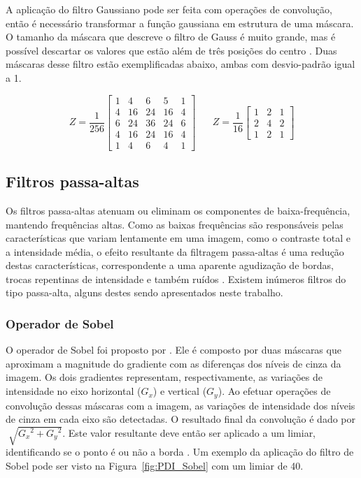 \documentclass[12pt,oneside,a4paper,english,french,spanish,brazil,]{abntex2}
\begin{document}
A aplicação do filtro Gaussiano pode ser feita com operações de convolução, então é necessário transformar a função gaussiana em estrutura de uma máscara. O tamanho da máscara que descreve o filtro de Gauss é muito grande, mas é possível descartar os valores que estão além de três posições do centro \cite{conci:2003}. Duas máscaras desse filtro estão exemplificadas abaixo, ambas com desvio-padrão igual a 1.

\[Z=\frac{1}{256}\begin{bmatrix}
1 & 4 & 6 & 5 & 1\\ 
4 & 16 & 24 & 16 & 4\\ 
6 & 24 & 36 & 24 & 6\\ 
4 & 16 & 24 & 16 & 4\\ 
1 & 4 & 6 & 4 & 1
\end{bmatrix}
\; \; \; \; \; \; 
Z=\frac{1}{16}\begin{bmatrix}
1 & 2 & 1\\ 
2 & 4 & 2\\ 
1 & 2 & 1
\end{bmatrix}
\]

\subsection{Filtros passa-altas}

Os filtros passa-altas atenuam ou eliminam os componentes de baixa-frequência, mantendo frequências altas. Como as baixas frequências são responsáveis pelas características que variam lentamente em uma imagem, como o contraste total e a intensidade média, o efeito resultante da filtragem passa-altas é uma redução destas características, correspondente a uma aparente agudização de bordas, trocas repentinas de intensidade e também ruídos \cite{gonzalez:2012}. Existem inúmeros filtros do tipo passa-alta, alguns destes sendo apresentados neste trabalho.

\subsubsection{Operador de Sobel}

O operador de Sobel foi proposto por \citet{sobel:1968}. Ele é composto por duas máscaras que aproximam a magnitude do gradiente com as diferenças dos níveis de cinza da imagem. Os dois gradientes representam, respectivamente, as variações de intensidade no eixo horizontal (\(G_x\)) e vertical (\(G_y\)). Ao efetuar operações de convolução dessas máscaras com a imagem, as variações de intensidade dos níveis de cinza em cada eixo são detectadas. O resultado final da convolução é dado por \(\sqrt[]{{G_x}^2 + {G_y}^2}\). Este valor resultante deve então ser aplicado a um limiar, identificando se o ponto é ou não a borda \cite{pedrini:2008}. Um exemplo da aplicação do filtro de Sobel pode ser visto na Figura~\ref{fig:PDI_Sobel} com um limiar de 40.
\end{document}
